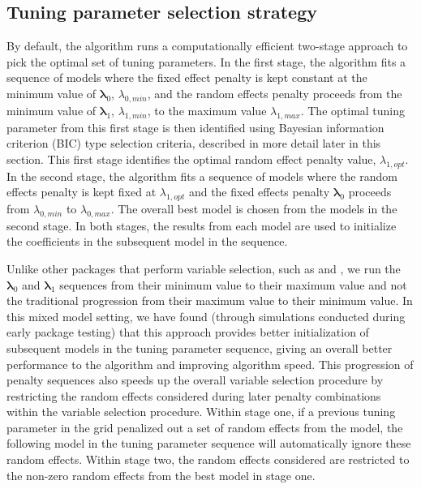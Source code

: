 \subsection{Tuning parameter selection strategy}
\label{sec:search}
By default, the algorithm runs a computationally efficient two-stage approach to pick the optimal set of tuning parameters. In the first stage, the algorithm fits a
sequence of models where the fixed effect penalty is kept constant at
the minimum value of \(\boldsymbol \lambda_0\), \(\lambda_{0,min}\), and
the random effects penalty proceeds from the minimum value of
\(\boldsymbol \lambda_1\), \(\lambda_{1,min}\), to the maximum value
\(\lambda_{1,max}\). The optimal tuning parameter from this first stage is then
identified using Bayesian information criterion (BIC) type selection criteria, described in more detail
later in this section. This first stage identifies the optimal random
effect penalty value, \(\lambda_{1,opt}\). In the second stage, the
algorithm fits a sequence of models where the random effects penalty is
kept fixed at \(\lambda_{1,opt}\) and the fixed effects penalty
\(\boldsymbol \lambda_0\) proceeds from \(\lambda_{0,min}\) to
\(\lambda_{0,max}\). The overall best model is chosen from the models in
the second stage. In both stages, the results from each model are used
to initialize the coefficients in the subsequent model in the sequence.

Unlike other packages that perform variable selection, such as 
and , we run the \(\boldsymbol \lambda_0\) and $\boldsymbol \lambda_1$ sequences from their minimum value to their maximum value and not the traditional progression from their maximum value to their minimum value. In this mixed model setting, we have found (through simulations conducted during early package testing) that
this approach provides better initialization of subsequent models in the
tuning parameter sequence, giving an overall better performance to the algorithm
and improving algorithm speed. 
This progression of penalty sequences also speeds up the overall variable selection procedure by restricting the random effects considered during later penalty combinations within the variable selection procedure.
Within stage one, if a previous tuning parameter in the grid penalized out
a set of random effects from the model, the following model in the tuning parameter sequence will automatically
ignore these random effects. Within stage two, the random effects considered
are restricted to the non-zero random effects from the best model in
stage one.

